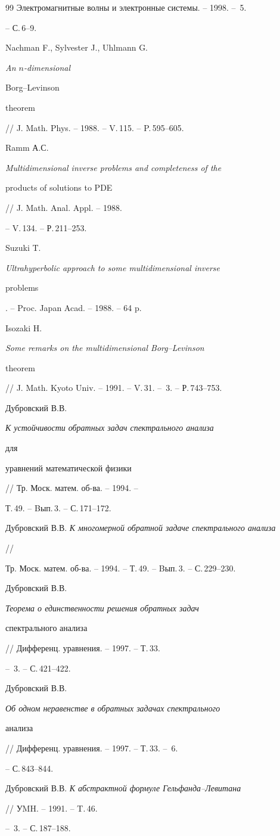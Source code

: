 \begin{thebibliography}{99}
Электромагнитные волны и электронные системы. -- 1998. -- \No\,5. 


-- С.\,6--9. 




Nachman F., Sylvester J., Uhlmann G. {\em An $n$-dimensional 


Borg--Levinson 


theorem} // J. Math. Phys. -- 1988. -- V.\,115. -- P.\,595--605. 




Ramm А.С. {\em Multidimensional inverse problems and completeness of the 


products of solutions to PDE} // J. Math. Anal. Appl. -- 1988. 


-- V.\,134. -- Р.\,211--253. 




Suzuki T. {\em Ultrahyperbolic approach to some multidimensional inverse 


problems}. -- Proc. Japan Acad. -- 1988. -- 64 p. 


\bibitem{} 


Isozaki H. {\em Some remarks on the multidimensional Borg--Levinson 


theorem} 


// J. Math. Kyoto Univ. -- 1991. -- V.\,31. -- \No\,3. -- Р.\,743--753. 




Дубровский В.В. {\em К устойчивости обратных задач спектрального анализа 


для 


уравнений математической физики} // Тр. Моск. матем. об-ва. -- 1994. -- 


Т.\,49. -- Bып.\,3. -- С.\,171--172. 




Дубровский В.В. {\em К многомерной обратной задаче спектрального анализа} 


// 


Тр. Моск. матем. об-ва. -- 1994. -- Т.\,49. -- Bып.\,3. -- С.\,229--230. 




Дубровский В.В. {\em Теорема о единственности решения обратных задач 


спектрального анализа} // Дифференц. уравнения. -- 1997. -- Т.\,33. 


-- \No\,3. -- С.\,421--422. 




Дубровский В.В. {\em Об одном неравенстве в обратных задачах спектрального 


анализа} // Дифференц. уравнения. -- 1997. -- Т.\,33. -- \No\,6. 


-- С.\,843--844. 




Дубровский В.В. {\em К абстрактной формуле Гельфанда--Левитана}


// УMH. -- 1991. -- T.\,46. 


-- \No\,3. -- С.\,187--188. 


 


\end{thebibliography} 

